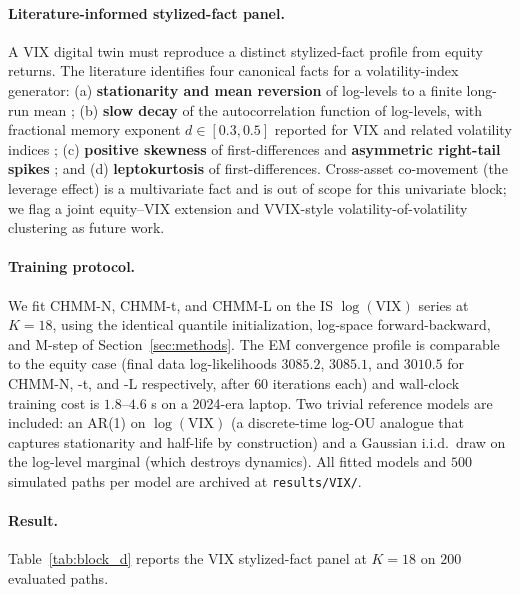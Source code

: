 \paragraph{Literature-informed stylized-fact panel.}
A VIX digital twin must reproduce a distinct stylized-fact profile from equity returns.
The literature identifies four canonical facts for a volatility-index generator: (a) \textbf{stationarity and mean reversion} of log-levels to a finite long-run mean \cite{papanicolaou2014regime, kaeck2013stochastic}; (b) \textbf{slow decay} of the autocorrelation function of log-levels, with fractional memory exponent $d \in [0.3, 0.5]$ reported for VIX and related volatility indices \cite{ghosh2022longmemory, chen2013longmemory}; (c) \textbf{positive skewness} of first-differences and \textbf{asymmetric right-tail spikes} \cite{dotsis2007empirical}; and (d) \textbf{leptokurtosis} of first-differences.
Cross-asset co-movement (the leverage effect) is a multivariate fact and is out of scope for this univariate block; we flag a joint equity--VIX extension and VVIX-style volatility-of-volatility clustering \cite{huang2023fear} as future work.

\paragraph{Training protocol.}
We fit CHMM-N, CHMM-t, and CHMM-L on the IS $\log(\text{VIX})$ series at $K = 18$, using the identical quantile initialization, log-space forward-backward, and M-step of Section~\ref{sec:methods}.
The EM convergence profile is comparable to the equity case (final data log-likelihoods $3085.2$, $3085.1$, and $3010.5$ for CHMM-N, -t, and -L respectively, after $60$ iterations each) and wall-clock training cost is $1.8$--$4.6$ s on a 2024-era laptop.
Two trivial reference models are included: an AR(1) on $\log(\text{VIX})$ (a discrete-time log-OU analogue that captures stationarity and half-life by construction) and a Gaussian i.i.d.\ draw on the log-level marginal (which destroys dynamics).
All fitted models and $500$ simulated paths per model are archived at \texttt{results/VIX/}.

\paragraph{Result.}
Table~\ref{tab:block_d} reports the VIX stylized-fact panel at $K = 18$ on $200$ evaluated paths.


